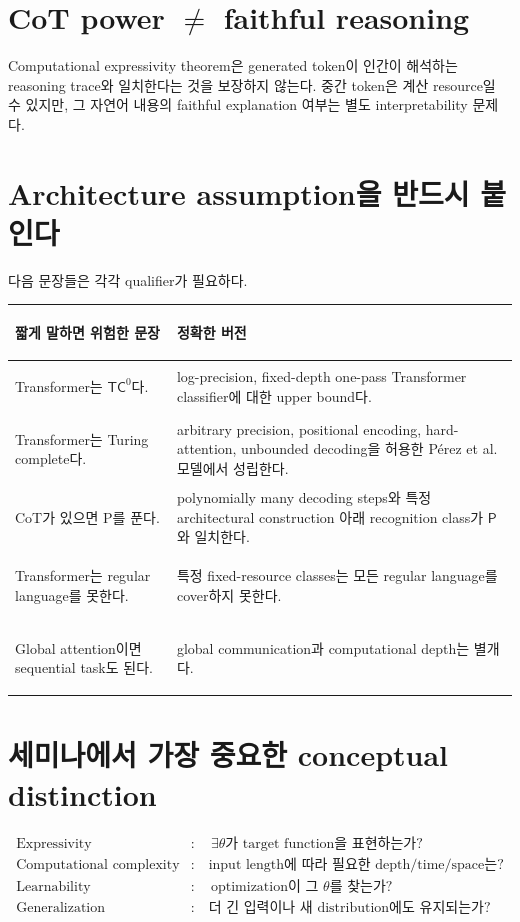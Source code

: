 \documentclass[11pt,a4paper,oneside,openany]{memoir}
\theoremstyle{definition}
\newcommand{\TC}{\mathsf{TC}}
\newcommand{\Pclass}{\mathsf{P}}
\begin{document}
\section{\texorpdfstring{CoT power $\neq$ faithful reasoning}{CoT power != faithful reasoning}}

Computational expressivity theorem은 generated token이 인간이 해석하는 reasoning trace와 일치한다는 것을 보장하지 않는다.
중간 token은 계산 resource일 수 있지만, 그 자연어 내용의 faithful explanation 여부는 별도 interpretability 문제다.

\section{Architecture assumption을 반드시 붙인다}

다음 문장들은 각각 qualifier가 필요하다.

\begin{center}
\small
\begin{tabularx}{\textwidth}{>{\bfseries\raggedright\arraybackslash}p{}Y}
\toprule
짧게 말하면 위험한 문장 & 정확한 버전 \\
\midrule
Transformer는 $\TC^0$다. & log-precision, fixed-depth one-pass Transformer classifier에 대한 upper bound다. \\
Transformer는 Turing complete다. & arbitrary precision, positional encoding, hard-attention, unbounded decoding을 허용한 Pérez et al. 모델에서 성립한다. \\
CoT가 있으면 P를 푼다. & polynomially many decoding steps와 특정 architectural construction 아래 recognition class가 $\Pclass$와 일치한다. \\
Transformer는 regular language를 못한다. & 특정 fixed-resource classes는 모든 regular language를 cover하지 못한다. \\
Global attention이면 sequential task도 된다. & global communication과 computational depth는 별개다. \\
\bottomrule
\end{tabularx}
\end{center}

\section{세미나에서 가장 중요한 conceptual distinction}

\begin{align*}
\text{Expressivity}
&:\quad \exists\theta\text{가 target function을 표현하는가?}\\
\text{Computational complexity}
&:\quad \text{input length에 따라 필요한 depth/time/space는?}\\
\text{Learnability}
&:\quad \text{optimization이 그 }\theta\text{를 찾는가?}\\
\text{Generalization}
&:\quad \text{더 긴 입력이나 새 distribution에도 유지되는가?}
\end{align*}
\end{document}
